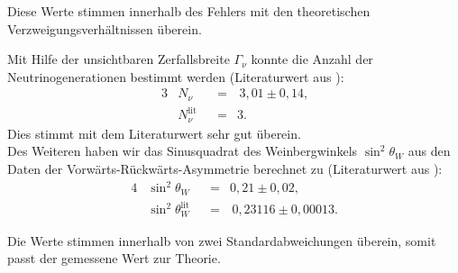 Diese Werte stimmen innerhalb des Fehlers mit den theoretischen Verzweigungsverhältnissen überein.

Mit Hilfe der unsichtbaren Zerfallsbreite $\Gamma_\nu$ konnte die Anzahl der Neutrinogenerationen bestimmt werden (Literaturwert aus \cite{anleitungalt}):
\begin{alignat}{3}
	&N_\nu&&=&\,3,01\pm0,14\text{,}\\
	&N_\nu^\text{lit}&&=&3\text{.}
\end{alignat} 
Dies stimmt mit dem Literaturwert sehr gut überein.\\

Des Weiteren haben wir das Sinusquadrat des Weinbergwinkels $\sin^2\theta_W$ aus den Daten der Vorwärts-Rückwärts-Asymmetrie berechnet zu (Literaturwert aus \cite{nakamura}):
\begin{alignat}{4}
	&\sin^2\theta_W&&=&0,21\pm0,02\text{,}\\
	&\sin^2\theta_W^\text{lit}&&=&\,0,23116\pm0,00013\text{.}
\end{alignat}

Die Werte stimmen innerhalb von zwei Standardabweichungen überein, somit passt der gemessene Wert zur Theorie.
